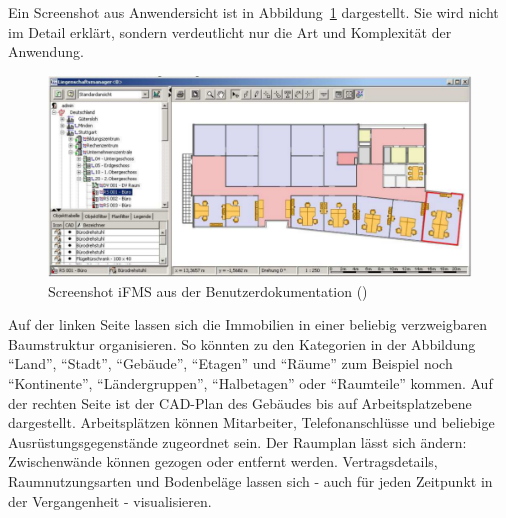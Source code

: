 Ein Screenshot aus Anwendersicht ist in Abbildung~\ref{fig:ifms_liegenschaftsbaum} dargestellt. Sie wird nicht im Detail erklärt, sondern verdeutlicht nur die Art und Komplexität der Anwendung.
\begin{figure}[!h]
\begin{center}
\includegraphics[width=\textwidth]{images/iFMS_liegenschaftsbaum.png}
\caption{Screenshot iFMS aus der 
Benutzerdokumentation (\protect{}) }
\label{fig:ifms_liegenschaftsbaum}
\end{center}
\end{figure}
Auf der linken Seite lassen sich die Immobilien in einer beliebig 
verzweigbaren Baumstruktur organisieren. So könnten zu den Kategorien in der 
Abbildung "`Land"', "`Stadt"', "`Gebäude"', "`Etagen"' und "`Räume"' zum Beispiel noch "`Kontinente"', 
"`Ländergruppen"', "`Halbetagen"' oder "`Raumteile"' kommen.
Auf der rechten Seite ist der CAD-Plan des Gebäudes bis auf Arbeitsplatzebene 
dargestellt. Arbeitsplätzen können Mitarbeiter, Telefonanschlüsse und beliebige 
Ausrüstungsgegenstände zugeordnet sein. Der Raumplan lässt sich ändern: 
Zwischenwände können gezogen oder entfernt werden. Vertragsdetails, 
Raumnutzungsarten und Bodenbeläge lassen sich - auch für jeden Zeitpunkt in der 
Vergangenheit - visualisieren.

